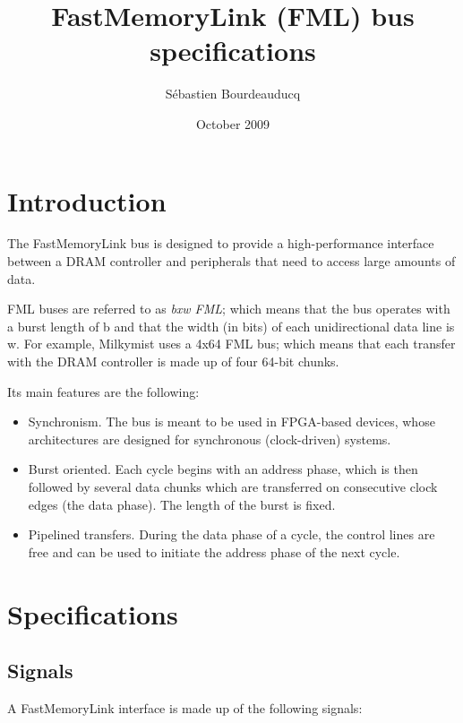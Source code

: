 \documentclass[a4paper,11pt]{article}
\title{FastMemoryLink (FML) bus specifications}
\author{S\'ebastien Bourdeauducq}
\date{October 2009}
\begin{document}
\setlength{\parindent}{0pt}
\setlength{\parskip}{5pt}
\maketitle{}

\section{Introduction}
The FastMemoryLink bus is designed to provide a high-performance interface between a DRAM controller and peripherals that need to access large amounts of data.

FML buses are referred to as \textit{bxw FML}; which means that the bus operates with a burst length of b and that the width (in bits) of each unidirectional data line is w. For example, Milkymist uses a 4x64 FML bus; which means that each transfer with the DRAM controller is made up of four 64-bit chunks.

Its main features are the following:
\begin{itemize}
\item Synchronism. The bus is meant to be used in FPGA-based devices, whose architectures are designed for synchronous (clock-driven) systems.
\item Burst oriented. Each cycle begins with an address phase, which is then followed by several data chunks  which are transferred on consecutive clock edges (the data phase). The length of the burst is fixed.
\item Pipelined transfers. During the data phase of a cycle, the control lines are free and can be used to initiate the address phase of the next cycle.
\end{itemize}

\section{Specifications}
\subsection{Signals}
A FastMemoryLink interface is made up of the following signals:
\end{document}

